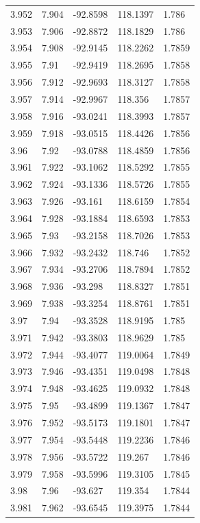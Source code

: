 \begin{tabular}{lllll}
3.952 & 7.904 & -92.8598 & 118.1397 & 1.786 \\
3.953 & 7.906 & -92.8872 & 118.1829 & 1.786 \\
3.954 & 7.908 & -92.9145 & 118.2262 & 1.7859 \\
3.955 & 7.91 & -92.9419 & 118.2695 & 1.7858 \\
3.956 & 7.912 & -92.9693 & 118.3127 & 1.7858 \\
3.957 & 7.914 & -92.9967 & 118.356 & 1.7857 \\
3.958 & 7.916 & -93.0241 & 118.3993 & 1.7857 \\
3.959 & 7.918 & -93.0515 & 118.4426 & 1.7856 \\
3.96 & 7.92 & -93.0788 & 118.4859 & 1.7856 \\
3.961 & 7.922 & -93.1062 & 118.5292 & 1.7855 \\
3.962 & 7.924 & -93.1336 & 118.5726 & 1.7855 \\
3.963 & 7.926 & -93.161 & 118.6159 & 1.7854 \\
3.964 & 7.928 & -93.1884 & 118.6593 & 1.7853 \\
3.965 & 7.93 & -93.2158 & 118.7026 & 1.7853 \\
3.966 & 7.932 & -93.2432 & 118.746 & 1.7852 \\
3.967 & 7.934 & -93.2706 & 118.7894 & 1.7852 \\
3.968 & 7.936 & -93.298 & 118.8327 & 1.7851 \\
3.969 & 7.938 & -93.3254 & 118.8761 & 1.7851 \\
3.97 & 7.94 & -93.3528 & 118.9195 & 1.785 \\
3.971 & 7.942 & -93.3803 & 118.9629 & 1.785 \\
3.972 & 7.944 & -93.4077 & 119.0064 & 1.7849 \\
3.973 & 7.946 & -93.4351 & 119.0498 & 1.7848 \\
3.974 & 7.948 & -93.4625 & 119.0932 & 1.7848 \\
3.975 & 7.95 & -93.4899 & 119.1367 & 1.7847 \\
3.976 & 7.952 & -93.5173 & 119.1801 & 1.7847 \\
3.977 & 7.954 & -93.5448 & 119.2236 & 1.7846 \\
3.978 & 7.956 & -93.5722 & 119.267 & 1.7846 \\
3.979 & 7.958 & -93.5996 & 119.3105 & 1.7845 \\
3.98 & 7.96 & -93.627 & 119.354 & 1.7844 \\
3.981 & 7.962 & -93.6545 & 119.3975 & 1.7844 \\

\end{tabular}
